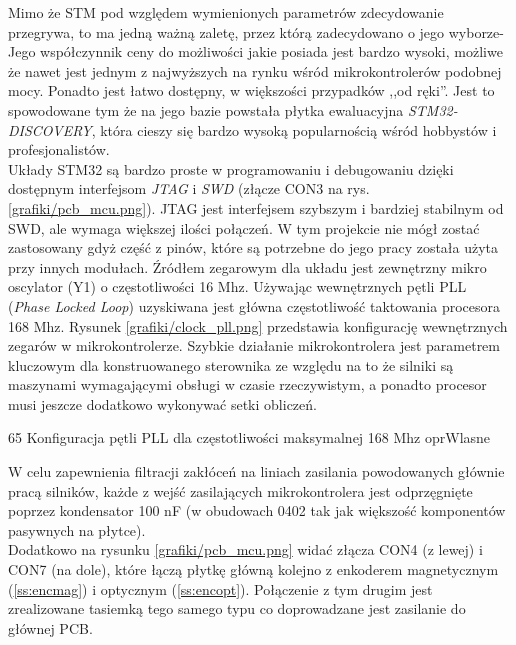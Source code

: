 Mimo że STM pod względem wymienionych parametrów zdecydowanie przegrywa, to ma jedną ważną zaletę, przez którą zadecydowano o jego wyborze- Jego współczynnik ceny do możliwości jakie posiada jest bardzo wysoki, możliwe że nawet jest jednym z najwyższych na rynku wśród mikrokontrolerów podobnej mocy. Ponadto jest łatwo dostępny, w większości przypadków ,,od ręki''. Jest to spowodowane tym że na jego bazie powstała płytka ewaluacyjna {\it STM32-DISCOVERY}, która cieszy się bardzo wysoką popularnością wśród hobbystów i profesjonalistów. \\

Układy STM32 są bardzo proste w programowaniu i debugowaniu dzięki dostępnym interfejsom {\it JTAG} i {\it SWD} (złącze CON3 na rys. \ref{grafiki/pcb_mcu.png}). JTAG jest interfejsem szybszym i bardziej stabilnym od SWD, ale wymaga większej ilości połączeń. W tym projekcie nie mógł zostać zastosowany gdyż część z pinów, które są potrzebne do jego pracy została użyta przy innych modułach. Źródłem zegarowym dla układu jest zewnętrzny mikro oscylator (Y1) o częstotliwości 16 Mhz. Używając wewnętrznych pętli PLL ({\it Phase Locked Loop}) uzyskiwana jest główna częstotliwość taktowania procesora 168 Mhz. Rysunek \ref{grafiki/clock_pll.png} przedstawia konfigurację wewnętrznych zegarów w mikrokontrolerze. Szybkie działanie mikrokontrolera jest parametrem kluczowym dla konstruowanego sterownika ze względu na to że silniki są maszynami wymagającymi obsługi w czasie rzeczywistym, a ponadto procesor musi jeszcze dodatkowo wykonywać setki obliczeń.

	{65}
	{Konfiguracja pętli PLL dla częstotliwości maksymalnej 168 Mhz}
	{oprWlasne}

W celu zapewnienia filtracji zakłóceń na liniach zasilania powodowanych głównie pracą silników, każde z wejść zasilających mikrokontrolera jest odprzęgnięte poprzez kondensator 100 nF (w obudowach 0402 tak jak większość komponentów pasywnych na płytce). \\

Dodatkowo na rysunku \ref{grafiki/pcb_mcu.png} widać złącza CON4 (z lewej) i CON7 (na dole), które łączą płytkę główną kolejno z enkoderem magnetycznym (\ref{ss:encmag}) i optycznym (\ref{ss:encopt}). Połączenie z tym drugim jest zrealizowane tasiemką tego samego typu co doprowadzane jest zasilanie do głównej PCB.








\clearpage














